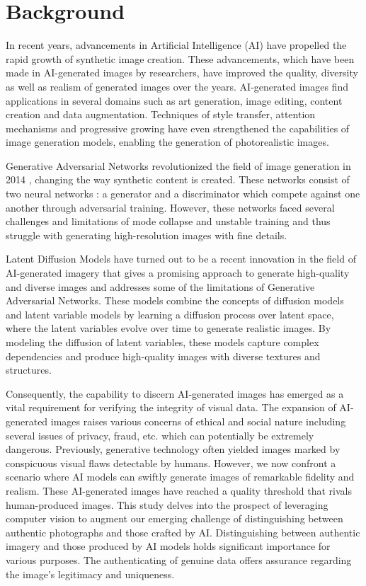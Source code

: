 
\section{Background}

In recent years, advancements in Artificial Intelligence (AI) have propelled the rapid growth of synthetic image creation. These advancements, which have been made in AI-generated images by researchers, have improved the quality, diversity as well as realism of generated images over the years. AI-generated images find applications in several domains such as art generation, image editing, content creation and data augmentation. Techniques of style transfer, attention mechanisms and progressive growing have even strengthened the capabilities of image generation models, enabling the generation of photorealistic images. 

Generative Adversarial Networks revolutionized the field of image generation in 2014 \cite{goodfellow}, changing the way synthetic content is created. These networks consist of two neural networks : a generator and a discriminator which compete against one another through adversarial training. However, these networks faced several challenges and limitations of mode collapse and unstable training and thus struggle with generating high-resolution images with fine details.

Latent Diffusion Models have turned out to be a recent innovation in the field of AI-generated imagery that gives a promising approach to generate high-quality and diverse images and addresses some of the limitations of Generative Adversarial Networks. \cite{2} These models combine the concepts of diffusion models and latent variable models by learning a diffusion process over latent space, where the latent variables evolve over time to generate realistic images. By modeling the diffusion of latent variables, these models capture complex dependencies and produce high-quality images with diverse textures and structures. 

Consequently, the capability to discern AI-generated images has emerged as a vital requirement for verifying the integrity of visual data. The expansion of AI-generated images raises various concerns of ethical and social nature including several issues of privacy, fraud, etc. which can potentially be extremely dangerous. Previously, generative technology often yielded images marked by conspicuous visual flaws detectable by humans. However, we now confront a scenario where AI models can swiftly generate images of remarkable fidelity and realism. These AI-generated images have reached a quality threshold that rivals human-produced images. 
This study delves into the prospect of leveraging computer vision to augment our emerging challenge of distinguishing between authentic photographs and those crafted by AI. Distinguishing between authentic imagery and those produced by AI models holds significant importance for various purposes. The authenticating of genuine data offers assurance regarding the image's legitimacy and uniqueness.


